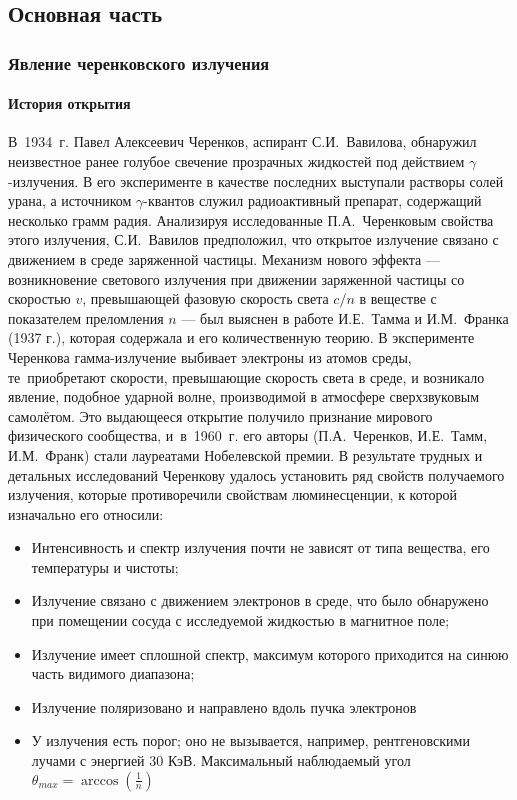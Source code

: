 \begin{main}
	\def\dd#1#2{\frac{d#1}{d#2}}
	\fontsize{16}{14pt}\selectfont
	\part{Основная часть}	
	\label{sec:part}
	
	\section{Явление черенковского излучения}
	\label{sec:section}
	
	\subsection{История открытия}
	\label{sec:subsection}
	В~1934~г. Павел Алексеевич Черенков, аспирант С.И.~Вавилова, обнаружил неизвестное ранее голубое свечение прозрачных жидкостей под действием $\gamma$-излучения. 
	В его эксперименте в качестве последних выступали растворы солей урана, а источником $\gamma$-квантов служил радиоактивный препарат, содержащий несколько грамм радия.
	 Анализируя исследованные П.А.~Черенковым свойства этого излучения, С.И.~Вавилов предположил, что открытое излучение связано с движением в среде заряженной частицы. 
	 Механизм нового эффекта --- возникновение светового излучения при движении заряженной частицы со скоростью $v$, превышающей фазовую скорость света $c/n$ в веществе с показателем преломления $n$ --- был выяснен в работе И.Е.~Тамма и И.М.~Франка (1937 г.), которая содержала и его количественную теорию.
	 В эксперименте Черенкова гамма-излучение выбивает электроны из атомов среды, те~приобретают скорости, превышающие скорость света в среде, и возникало явление, подобное ударной волне, производимой в атмосфере сверхзвуковым самолётом.
	 Это выдающееся открытие получило признание мирового физического сообщества, и~в~1960~г. его авторы (П.А.~Черенков, И.Е.~Тамм, И.М.~Франк) стали лауреатами Нобелевской премии.
	 В результате трудных и детальных исследований Черенкову удалось установить ряд свойств получаемого излучения, которые противоречили свойствам люминесценции, к которой изначально его относили:
	 \begin{itemize}
	 	\item Интенсивность и спектр излучения почти не зависят от типа вещества, его температуры и чистоты;
	 	\item Излучение связано с движением электронов в среде, что было обнаружено при помещении сосуда с исследуемой жидкостью в магнитное поле;
	 	\item Излучение имеет сплошной спектр, максимум которого приходится на синюю часть видимого диапазона;
	 	\item Излучение поляризовано и направлено вдоль пучка электронов
	 	\item У излучения есть порог; оно не вызывается, например, рентгеновскими лучами с энергией 30 КэВ. Максимальный наблюдаемый угол $ \theta_{max} = \arccos(\frac{1}{n}) $
	 \end{itemize}
	 

\end{main}
